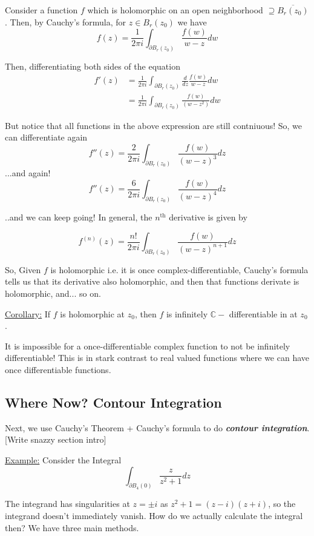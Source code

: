 \documentclass{article}
\newcommand{\C}{\mathbb{C}}
\begin{document}
\vskip 0.5cm
Consider a function $f$ which is holomorphic on an open neighborhood $\supseteq \overline{B_{r}(z_0)}$. Then, by Cauchy's formula, for $z \in B_r(z_0)$ we have 
\[  f(z) = \frac{1}{2\pi i} \int_{\partial B_r(z_0)} \frac{f(w)}{w - z} dw  \]

Then, differentiating both sides of the equation 
\begin{align*}
  f'(z) &= \frac{1}{2\pi i} \int_{\partial B_r(z_0)} \frac{d}{dz} \frac{f(w)}{w - z} dw \\
  &= \frac{1}{2\pi i } \int_{\partial B_r(z_0)} \frac{f(w)}{(w - z^2)} dw 
\end{align*}

But notice that all functions in the above expression are still contniuous! So, we can differentiate again 
\[ f''(z) = \frac{2}{2\pi i} \int_{\partial B_r(z_0)} \frac{f(w)}{(w-z)^3} dz \]
...and again!
\[ f''(z) = \frac{6}{2\pi i} \int_{\partial B_r(z_0)} \frac{f(w)}{(w-z)^4} dz  \]

\vskip 1cm
..and we can keep going! In general, the $n^{\text{th}}$ derivative is given by 

\[\boxed{ f^{(n)} (z) = \frac{n!}{2\pi i} \int_{\partial B_r(z_0)} \frac{f(w)}{(w-z)^{n+1}} dz}  \]

\vskip 0.5cm
So, Given $f$ is holomorphic i.e. it is once complex-differentiable, Cauchy's formula tells us that its derivative also holomorphic, and then that functions derivate is holomorphic, and... so on. 
\begin{dottedbox}
  \underline{Corollary:} If $f$ is holomorphic at $z_0$, then $f$ is infinitely $\C-$ differentiable in at $z_0$.
\end{dottedbox}

\vskip 0.5cm
It is impossible for a once-differentiable complex function to not be infinitely differentiable! This is in stark contrast to real valued functions where we can have once differentiable functions.

\vskip 0.5cm
\subsection{Where Now? Contour Integration}
Next, we use Cauchy's Theorem + Cauchy's formula to do \emph{\textbf{contour integration}}. [Write snazzy section intro]

\vskip 0.5cm
\underline{Example:} Consider the Integral
\[ \int_{\partial B_4(0)} \frac{z}{z^2 + 1} dz \]

The integrand has singularities at $z = \pm i$ as $z^2 + 1 = (z-i)(z+i)$, so the integrand doesn't immediately vanish. How do we actually calculate the integral then? We have three main methods.
\end{document}
